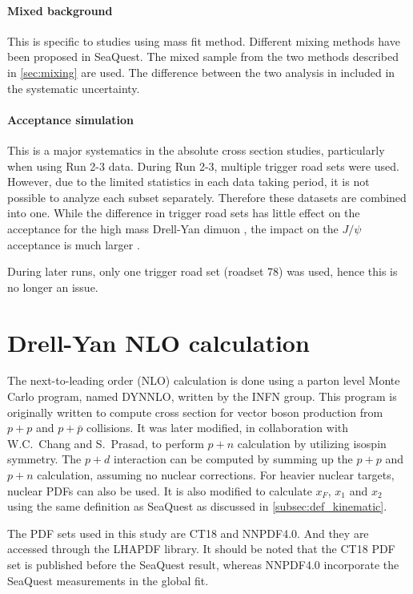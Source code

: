\documentclass[../main.tex]{subfiles}
\begin{document}
\paragraph{Mixed background}
This is specific to studies using mass fit method. Different mixing methods have been proposed in SeaQuest.
The mixed sample from the two methods described in \cref{sec:mixing} are used. The difference between 
the two analysis in included in the systematic uncertainty.

\paragraph{Acceptance simulation}
This is a major systematics in the absolute cross section studies, particularly when using
Run 2-3 data.
During Run 2-3, multiple trigger road sets were used. However, due to the limited statistics in each
data taking period, it is not possible to analyze each subset separately. Therefore these datasets
are combined into one. While the difference in trigger road sets has little effect on the acceptance
for the high mass Drell-Yan dimuon \cite{jdove-8168}, the impact on the $J/\psi$ acceptance is much
larger \cite{chleung-9643}.

During later runs, only one trigger road set (roadset 78) was used, hence this is no
longer an issue.



\section{Drell-Yan NLO calculation}
The next-to-leading order (NLO) calculation is done using a parton level Monte
Carlo program, named DYNNLO, written by the INFN group\cite{catani2009,catani2007}. This program
is originally written to compute cross section for vector boson
production from $p+p$ and $p+\bar{p}$ collisions. It was later modified, in
collaboration with W.C.~Chang and S.~Prasad, to perform $p+n$ calculation
by utilizing isospin symmetry. The $p+d$ interaction can be computed by summing up
the $p+p$ and $p+n$ calculation, assuming no nuclear corrections. For heavier nuclear
targets, nuclear PDFs can also be used. It is also modified to calculate $x_F$, $x_1$ and $x_2$
using the same definition as SeaQuest as discussed in \cref{subsec:def_kinematic}.

The PDF sets used in this study are CT18\cite{hou2021} and NNPDF4.0\cite{ball2021}.
And they are accessed through the LHAPDF library\cite{buckley2015}. It should be noted
that the CT18 PDF set is published before the SeaQuest result, whereas NNPDF4.0
incorporate the SeaQuest measurements\cite{dove2021} in the global fit.
\end{document}
